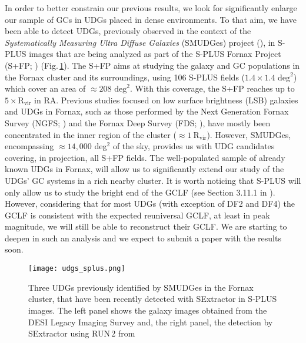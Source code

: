 \documentclass[baaa]{baaa}
\begin{document}
In order to better constrain our previous results, we look for significantly enlarge our sample of GCs in UDGs placed in dense environments. To that aim, we have been able to detect UDGs, previously observed in the context of the {\it Systematically Measuring Ultra Diffuse Galaxies} (SMUDGes) project  (\citealt{Zaritsky_2019_SMUDGes,Zaritsky2023}), in S-PLUS images that are being analyzed as part of the S-PLUS Fornax Project (S+FP; \citealt{SC2024}) (Fig.\,\ref{LSBs_Fornax}). The S+FP aims at studying the galaxy  and GC populations in the Fornax cluster and its surroundings, using 106 S-PLUS fields ($1.4 \times 1.4 \textrm{ deg}^2$) which cover an area of $\approx 208 \textrm{ deg}^2$. With this coverage, the S+FP reaches up to $5\times \textrm{R}_{\textrm{vir}}$ in RA.
Previous studies focused on low surface brightness (LSB) galaxies and UDGs in Fornax, such as those performed by the Next Generation Fornax Survey (NGFS; \cite{Munioz2015}) and the Fornax Deep Survey (FDS;  \citealt{Venhola2017,Venhola2022}), have mostly been concentrated in the inner region of the cluster ($\approx1~\textrm{R}_{\textrm{vir}}$). However, SMUDGes, encompassing $\approx 14,000$ deg$^2$ of the sky, provides us with UDG candidates covering, in projection, all S+FP fields. The well-populated sample of already known UDGs  in Fornax, will allow us to significantly extend our study of the UDGs' GC systems in a rich nearby cluster.  
It is worth noticing that S-PLUS will only allow us to study the bright end of the GCLF (see Section 3.11.1 in \citealt{SC2024}). However, considering that for most UDGs (with exception of DF2 and DF4) the GCLF is consistent with the expected reuniversal GCLF, at least in peak magnitude, we will still be able to  reconstruct their GCLF. We are starting to deepen in such an analysis and we expect to submit a paper with the results soon.  


\begin{figure}[h!]
    \centering
    \texttt{[image: udgs\_splus.png]}
    \caption{Three UDGs previously identified by SMUDGes in the Fornax cluster, that have been recently detected with SExtractor in S-PLUS images. The
left panel shows the galaxy images obtained from the DESI Legacy Imaging Survey and, the right panel, the detection by SExtractor using RUN\,2 from \cite{Haack2023} }
    \label{LSBs_Fornax}
\end{figure}
\end{document}
